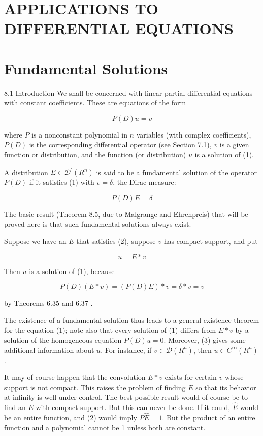 \documentclass[10pt]{article}
\begin{document}
\section{APPLICATIONS TO DIFFERENTIAL EQUATIONS}
\section{Fundamental Solutions}
8.1 Introduction We shall be concerned with linear partial differential equations with constant coefficients. These are equations of the form

$$
P(D) u=v
$$

where $P$ is a nonconstant polynomial in $n$ variables (with complex coefficients), $P(D)$ is the corresponding differential operator (see Section 7.1), $v$ is a given function or distribution, and the function (or distribution) $u$ is a solution of (1).

A distribution $E \in \mathscr{D}^{\prime}\left(R^{n}\right)$ is said to be a fundamental solution of the operator $P(D)$ if it satisfies (1) with $v=\delta$, the Dirac measure:

$$
P(D) E=\delta
$$

The basic result (Theorem 8.5, due to Malgrange and Ehrenpreis) that will be proved here is that such fundamental solutions always exist.

Suppose we have an $E$ that satisfies (2), suppose $v$ has compact support, and put

$$
u=E * v
$$

Then $u$ is a solution of (1), because

$$
P(D)(E * v)=(P(D) E) * v=\delta * v=v
$$

by Theorems 6.35 and 6.37 .

The existence of a fundamental solution thus leads to a general existence theorem for the equation (1); note also that every solution of (1) differs from $E * v$ by a solution of the homogeneous equation $P(D) u=0$. Moreover, (3) gives some additional information about $u$. For instance, if $v \in \mathscr{D}\left(R^{n}\right)$, then $u \in C^{\infty}\left(R^{n}\right)$.

It may of course happen that the convolution $E * v$ exists for certain $v$ whose support is not compact. This raises the problem of finding $E$ so that its behavior at infinity is well under control. The best possible result would of course be to find an $E$ with compact support. But this can never be done. If it could, $\hat{E}$ would be an entire function, and (2) would imply $P \hat{E}=1$. But the product of an entire function and a polynomial cannot be 1 unless both are constant.
\end{document}
